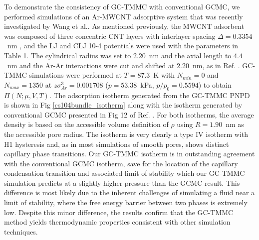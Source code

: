 To demonstrate the consistency of GC-TMMC with conventional GCMC, we performed simulations of an Ar-MWCNT adsorptive system that was recently investigated by Wang et al.\cite{Wang_Study_2011}. As mentioned previously, the MWCNT adsorbent was composed of three concentric CNT layers with interlayer spacing $\Delta = 0.3354$~nm \cite{3MWCNT_Note}, and the LJ and CLJ 10-4 potentials were used with the parameters in Table 1. The cylindrical radius was set to $2.20$~nm and the axial length to $4.4$~nm and the Ar-Ar interactions were cut and shifted at $2.20$~nm, as in Ref. . GC-TMMC simulations were performed at $T=87.3$~K with $N_{min} = 0$ and $N_{max} = 1350$ at $z\sigma_{Ar}^3 = 0.001708$ ($p=53.38$~kPa, $p/p_0=0.5594$) to obtain $\Pi\left(N;\mu,V,T\right)$. The adsorption isotherm generated from the GC-TMMC PNPD is shown in Fig \ref{cs104bundle_isotherm} along with the isotherm generated by conventional GCMC presented in Fig 12 of Ref. \cite{Wang_Study_2011}. For both isotherms, the average density is based on the accessible volume definition of $\rho$ using $R = 1.90$~nm as the accessible pore radius. The isotherm is very clearly a type IV isotherm with H1 hysteresis and, as in most simulations of smooth pores, shows distinct capillary phase transitions. Our GC-TMMC isotherm is in outstanding agreement with the conventional GCMC isotherm, save for the location of the capillary condensation transition and associated limit of stability which our GC-TMMC simulation predicts at a slightly higher pressure than the GCMC result. This difference is most likely due to the inherent challenges of simulating a fluid near a limit of stability, where the free energy barrier between two phases is extremely low. Despite this minor difference, the results confirm that the GC-TMMC method yields thermodynamic properties consistent with other simulation techniques.

